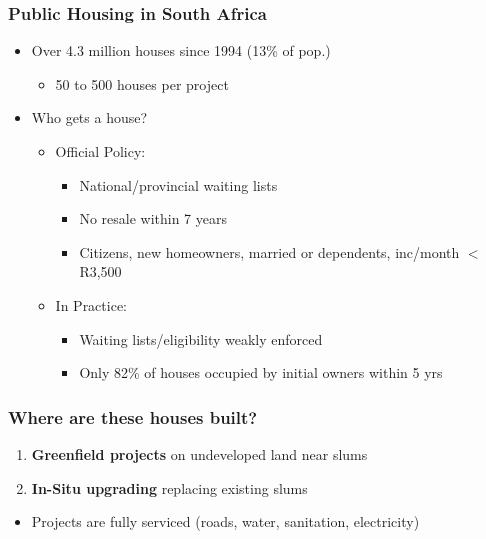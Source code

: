\documentclass[aspectratio=149]{beamer}
\begin{document}
\begin{frame}
\frametitle{Public Housing in South Africa}
  \begin{itemize}
      \item Over 4.3 million houses since 1994 (13\% of pop.)
      \begin{itemize}
        \item 50 to 500 houses per project
      \end{itemize}
  \end{itemize}


\begin{itemize}
        \item Who gets a house?
      \begin{itemize}
        \item Official Policy: 
          \begin{itemize}
            \item National/provincial waiting lists
            \item No resale within 7 years
            \item Citizens, new homeowners, married or dependents, inc/month $<$R3,500
          \end{itemize}
        \item In Practice:
          \begin{itemize}
            \item Waiting lists/eligibility weakly enforced
            \item Only 82\% of houses occupied by initial owners within 5 yrs
          \end{itemize}
      \end{itemize}
\end{itemize}
\end{frame}


\begin{frame}
\frametitle{Where are these houses built?}

\begin{enumerate}
  \item \textbf{Greenfield projects} on undeveloped land near slums
  \item \textbf{In-Situ upgrading} replacing existing slums
\end{enumerate}

\begin{itemize}
  \item Projects are fully serviced (roads, water, sanitation, electricity)
\end{itemize}

\end{frame}
\end{document}
